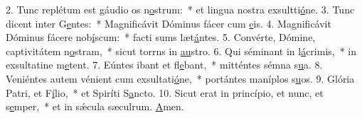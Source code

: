 2. Tunc replétum est gáudio os n\uline{o}strum:~* et lingua nostra exsultti\uline{ó}ne.
3. Tunc dicent inter G\uline{e}ntes:~* Magnificávit Dóminus fácer cum \uline{e}is.
4. Magnificávit Dóminus fácere nob\uline{í}scum:~* facti sums læt\uline{á}ntes.
5. Convérte, Dómine, captivitátem n\uline{o}stram,~* sicut torrns in \uline{au}stro.
6. Qui séminant in l\uline{á}crimis,~* in exsultatine m\uline{e}tent.
7. Eúntes ibant et fl\uline{e}bant,~* mitténtes sémna s\uline{u}a.
8. Veniéntes autem vénient cum exsultati\uline{ó}ne,~* portántes maníplos s\uline{u}os.
9. Glória Patri, et F\uline{í}lio,~* et Spiríti S\uline{a}ncto.
10. Sicut erat in princípio, et nunc, et s\uline{e}mper,~* et in sǽcula sæculrum. \uline{A}men.
